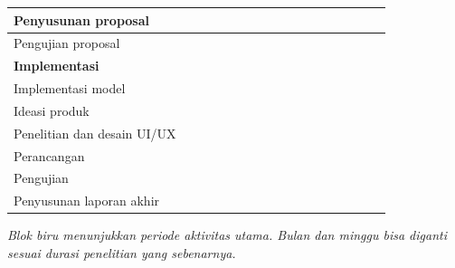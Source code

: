 \begin{table}[htbp]
{\begin{tabular}{|p{4.2cm}|*{16}{c|}}
			\hline
			Penyusunan proposal         &                                 &                               & \taskbar                       & \taskbar                       & \taskbar & \taskbar & \taskbar &          &          &          &          &          &          &          &          &          \\
			\hline
			Pengujian proposal          &                                 &                               &                                &                                &          &          &          & \taskbar &          &          &          &          &          &          &          &          \\
			\hline
			\multicolumn{17}{|l|}{\textbf{Implementasi}}                                                                                                                                                                                                                                                        \\
			\hline
			Implementasi model          &                                 &                               &                                &                                &          &          & \taskbar & \taskbar & \taskbar & \taskbar &          &          &          &          &          &          \\
			\hline
			Ideasi produk               &                                 &                               &                                &                                &          &          & \taskbar & \taskbar & \taskbar & \taskbar &          &          &          &          &          &          \\
			\hline
			Penelitian dan desain UI/UX &                                 &                               &                                &                                &          &          &          & \taskbar & \taskbar &          &          &          &          &          &          &          \\
			\hline
			Perancangan                 &                                 &                               &                                &                                &          &          &          &          & \taskbar & \taskbar & \taskbar &          & \taskbar &          &          &          \\
			\hline
			Pengujian                   &                                 &                               &                                &                                &          &          &          &          &          &          & \taskbar & \taskbar & \taskbar & \taskbar &          &          \\
			\hline
			Penyusunan laporan akhir    &                                 &                               &                                &                                &          &          &          &          &          &          &          &          &          & \taskbar & \taskbar & \taskbar \\
			\hline
		\end{tabular}%
	}
\end{table}

\noindent\textit{Blok biru menunjukkan periode aktivitas utama. Bulan dan minggu bisa diganti sesuai durasi penelitian yang sebenarnya.}
